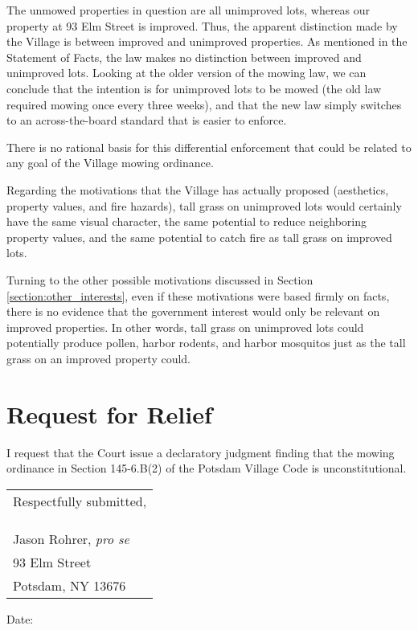 \documentclass[12pt]{article}
\begin{document}
The unmowed properties in question are all unimproved lots, whereas our property at 93 Elm Street is improved.
Thus, the apparent distinction made by the Village is between improved and unimproved properties.
As mentioned in the Statement of Facts, the law makes no distinction between improved and unimproved lots.
Looking at the older version of the mowing law, we can conclude that the intention is for unimproved lots to be mowed (the old law required mowing once every three weeks), and that the new law simply switches to an across-the-board standard that is easier to enforce.

There is no rational basis for this differential enforcement that could be related to any goal of the Village mowing ordinance.

Regarding the motivations that the Village has actually proposed (aesthetics, property values, and fire hazards), tall grass on unimproved lots would certainly have the same visual character, the same potential to reduce neighboring property values, and the same potential to catch fire as tall grass on improved lots.  

Turning to the other possible motivations discussed in Section \ref{section:other_interests}, even if these motivations were based firmly on facts, there is no evidence that the government interest would only be relevant on improved properties.
In other words, tall grass on unimproved lots could potentially produce pollen, harbor rodents, and harbor mosquitos just as the tall grass on an improved property could.






\section{Request for Relief}

I request that the Court issue a declaratory judgment finding that the mowing ordinance in Section 145-6.B(2) of the Potsdam Village Code is unconstitutional.
\begin{flushright}
\begin{tabular}{l}
Respectfully submitted,\\
\\
\\
\hline
\\
Jason Rohrer, {\em pro se}\\
93 Elm Street\\
Potsdam, NY 13676
\end{tabular}
\end{flushright}
Date:\underline{\hspace{2in}}
\end{document}
